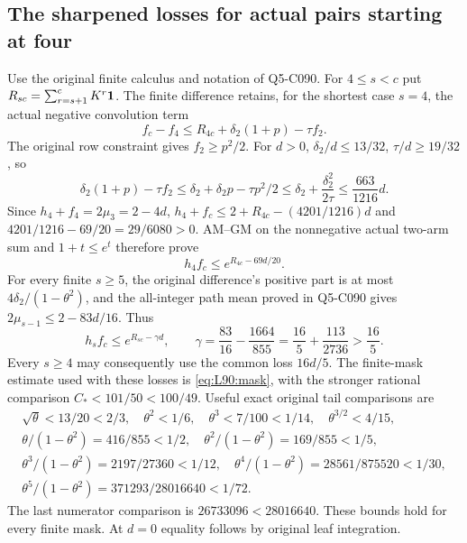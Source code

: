 \subsection{The sharpened losses for actual pairs starting at four}\label{proof:Q5-C096}
Use the original finite calculus and notation of Q5-C090.
For $4\le s<c$ put $R_{sc}=\sum_{r=s+1}^cK^r\mathbf1$.
The finite difference retains, for the shortest case $s=4$, the actual
negative convolution term
\[
f_c-f_4\le R_{4c}+\delta_2(1+p)-\tau f_2.
\]
The original row constraint gives $f_2\ge p^2/2$.
For $d>0$, $\delta_2/d\le13/32$, $\tau/d\ge19/32$, so
\[
\delta_2(1+p)-\tau f_2
\le\delta_2+\delta_2p-\tau p^2/2
\le\delta_2+\frac{\delta_2^2}{2\tau}\le\frac{663}{1216}d.
\]
Since $h_4+f_4=2\mu_3=2-4d$,
$h_4+f_c\le2+R_{4c}-(4201/1216)d$ and
$4201/1216-69/20=29/6080>0$.
AM--GM on the nonnegative actual two-arm sum and $1+t\le e^t$
therefore prove
\begin{equation}\tag{L96.2.5}\label{eq:L96:four}
h_4f_c\le e^{R_{4c}-69d/20}.
\end{equation}
For every finite $s\ge5$, the original difference's positive part
is at most $4\delta_2/(1-\theta^2)$, and the all-integer path mean
proved in Q5-C090 gives $2\mu_{s-1}\le2-83d/16$.
Thus
\begin{equation}\tag{L96.2.6}\label{eq:L96:long}
h_sf_c\le e^{R_{sc}-\gamma d},\qquad
\gamma=\frac{83}{16}-\frac{1664}{855}
=\frac{16}{5}+\frac{113}{2736}>\frac{16}{5}.
\end{equation}
Every $s\ge4$ may consequently use the common loss $16d/5$.
The finite-mask estimate used with these losses is
\eqref{eq:L90:mask}, with the stronger rational comparison
$C_*<101/50<100/49$. Useful exact original tail comparisons are
\[
\begin{gathered}
\sqrt\theta<13/20<2/3,\quad\theta^2<1/6,
\quad\theta^3<7/100<1/14,\quad\theta^{3/2}<4/15,\\
\theta/(1-\theta^2)=416/855<1/2,\quad
\theta^2/(1-\theta^2)=169/855<1/5,\\
\theta^3/(1-\theta^2)=2197/27360<1/12,\quad
\theta^4/(1-\theta^2)=28561/875520<1/30,\\
\theta^5/(1-\theta^2)=371293/28016640<1/72.
\end{gathered}
\]
The last numerator comparison is $26733096<28016640$.
These bounds hold for every finite mask. At $d=0$ equality follows by original leaf integration.
